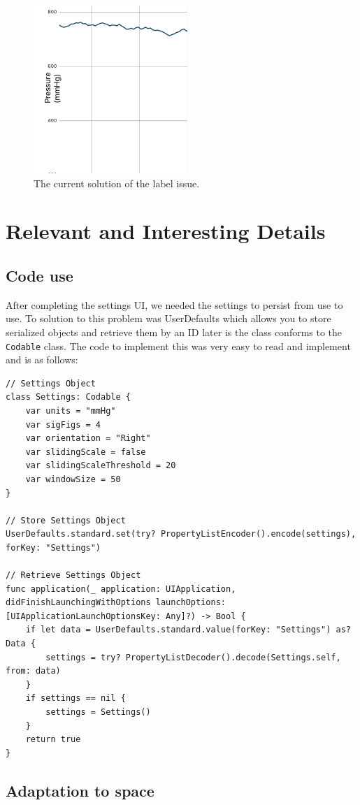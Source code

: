 \documentclass[onecolumn, draftclsnofoot,10pt, compsoc]{IEEEtran}
\begin{document}
\begin{figure}[H]
  \centering
  \includegraphics[width=.3\linewidth]{solution}
  \caption{The current solution of the label issue.}
  \label{fig:solution}
\end{figure}


\section{Relevant and Interesting Details}
\subsection{Code use}
    After completing the settings UI, we needed the settings to persist from use to use.
    To solution to this problem was UserDefaults which allows you to store serialized objects and retrieve them by an ID later is the class conforms to the \texttt{Codable} class.
    The code to implement this was very easy to read and implement and is as follows:

\begin{lstlisting}
// Settings Object
class Settings: Codable {
    var units = "mmHg"
    var sigFigs = 4
    var orientation = "Right"
    var slidingScale = false
    var slidingScaleThreshold = 20
    var windowSize = 50
}

// Store Settings Object
UserDefaults.standard.set(try? PropertyListEncoder().encode(settings), forKey: "Settings")

// Retrieve Settings Object
func application(_ application: UIApplication, didFinishLaunchingWithOptions launchOptions: [UIApplicationLaunchOptionsKey: Any]?) -> Bool {
    if let data = UserDefaults.standard.value(forKey: "Settings") as? Data {
        settings = try? PropertyListDecoder().decode(Settings.self, from: data)
    }
    if settings == nil {
        settings = Settings()
    }
    return true
}

\end{lstlisting}


\subsection{Adaptation to space }
\end{document}
